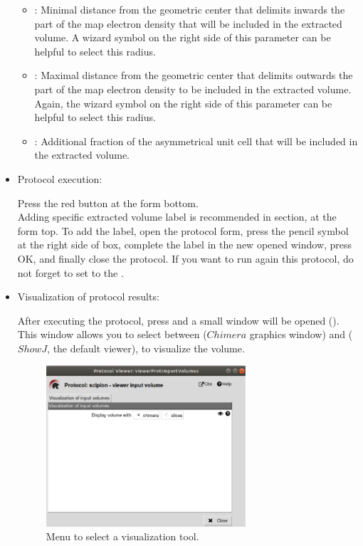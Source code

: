 \begin{itemize}
\begin{itemize}
  \item {}: Minimal distance from the geometric center that delimits inwards the part of the map electron density that will be included in the extracted volume. A wizard symbol on the right side of this parameter can be helpful to select this radius.
  \item {}: Maximal distance from the geometric center that delimits outwards the part of the map electron density to be included in the extracted volume. Again, the wizard symbol on the right side of this parameter can be helpful to select this radius.
  \item {}: Additional fraction of the asymmetrical unit cell that will be included in the extracted volume.
  \end{itemize}

  \item Protocol execution:
  
  Press the  red button at the form bottom.\\
  Adding specific extracted volume label is recommended in  section, at the form top. To add the label, open the protocol form, press the pencil symbol at the right side of  box, complete the label in the new opened window, press OK, and finally close the protocol. If you want to run again this protocol, do not forget to set to  the .
  
  \item Visualization of protocol results:
  
  After executing the protocol, press  and a small window will be opened (). This window allows you to select between  ($Chimera$ graphics window) and  ($ShowJ$, the default \scipion viewer), to visualize the volume.
  
    \begin{figure}[H]
    \centering 
    \captionsetup{width=.7\linewidth} 
    \includegraphics[width=0.70\textwidth]{Images_appendix/Fig101.pdf}
    \caption{Menu to select a visualization tool.}
    \label{fig:app_protocol_volume_2}
   \end{figure}
   

\end{itemize}
